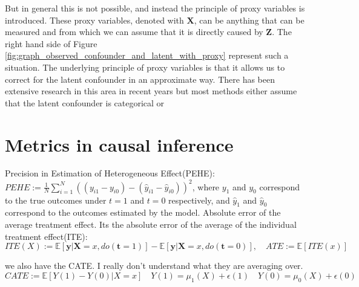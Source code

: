 \documentclass{report}
\newcommand{\E}{\mathbb{E}}
\newcommand{\bt}{\mathbf{t}}
\newcommand{\bX}{\mathbf{X}}
\newcommand{\by}{\mathbf{y}}
\newcommand{\bZ}{\mathbf{Z}}
\begin{document}
But in general this is not possible, and instead the principle of proxy variables is introduced. These proxy variables, denoted with $\bX$, can be anything that can be measured and from which we can assume that it is directly caused by $\bZ$. The right hand side of Figure \ref{fig:graph_observed_confounder_and_latent_with_proxy} represent such a situation. The underlying principle of proxy variables is that it allows us to correct for the latent confounder in an approximate way. There has been extensive research in this area in recent years but most methods either assume that the latent confounder is categorical or 

\section{Metrics in causal inference}
Precision in Estimation of Heterogeneous Effect(PEHE): $PEHE := \frac{1}{N}\sum\limits^N_{i=1}((y_{i1} - y_{i0}) - (\hat{y}_{i1} - \hat{y}_{i0}))^2$, where $y_1$ and $y_0$ correspond to the true outcomes under $t=1$ and $t=0$ respectively, and $\hat{y}_1$ and $\hat{y}_0$ correspond to the outcomes estimated by the model. 
Absolute error of the average treatment effect. Its the absolute error of the average of the individual treatment effect(ITE): 
\begin{equation}
    ITE(X) := \E[\by | \bX=x, do(\bt=1)] - \E[\by | \bX=x, do(\bt=0)], \quad ATE := \E[ITE(x)]
\end{equation}

we also have the CATE. I really don't understand what they are averaging over.
\begin{equation}
    CATE := \E[Y(1) - Y(0) | X=x] \quad Y(1) = \mu_1(X) + \epsilon(1) \quad Y(0) = \mu_0(X) + \epsilon(0)
\end{equation}


\end{document}
